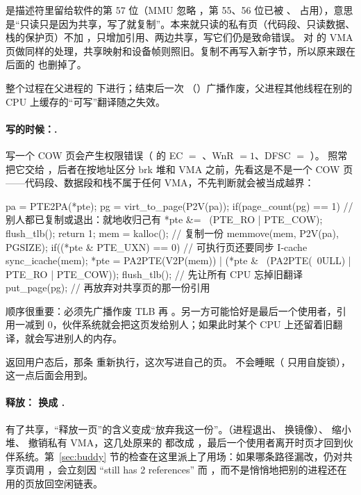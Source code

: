  是描述符里留给软件的第 57 位（MMU 忽略 \code{[58:55]}，第 55、56 位已被 、 占用），意思是“只读只是因为共享，写了就复制”。本来就只读的私有页（代码段、只读数据、栈的保护页）不加 ，只增加引用、两边共享，写它们仍是致命错误。 对  的 VMA 页做同样的处理，共享映射和设备帧则照旧。复制不再写入新字节，所以原来跟在  后面的  也删掉了。

整个过程在父进程的  下进行；结束后一次 （）广播作废，父进程其他线程在别的 CPU 上缓存的“可写”翻译随之失效。

\paragraph{写的时候：.} 写一个 COW 页会产生权限错误（ 的 EC $=$ 、WnR $=1$、DFSC $=$ ）。 照常把它交给 ，后者在按地址区分 brk 堆和 VMA 之前，先看这是不是一个 COW 页——代码段、数据段和栈不属于任何 VMA，不先判断就会被当成越界：

\begin{ccode}
pa = PTE2PA(*pte);
pg = virt_to_page(P2V(pa));
if(page_count(pg) == 1){                  // 别人都已复制或退出：就地收归己有
  *pte &= ~(PTE_RO | PTE_COW);
  flush_tlb();
  return 1;
}
mem = kalloc();                           // 复制一份
memmove(mem, P2V(pa), PGSIZE);
if((*pte & PTE_UXN) == 0)                 // 可执行页还要同步 I-cache
  sync_icache(mem);
*pte = PA2PTE(V2P(mem)) | (*pte & ~(PA2PTE(~0ULL) | PTE_RO | PTE_COW));
flush_tlb();                              // 先让所有 CPU 忘掉旧翻译
put_page(pg);                             // 再放弃对共享页的那一份引用
\end{ccode}

顺序很重要：必须先广播作废 TLB 再 。另一方可能恰好是最后一个使用者，引用一减到 0，伙伴系统就会把这页发给别人；如果此时某个 CPU 上还留着旧翻译，就会写进别人的内存。

返回用户态后，那条  重新执行，这次写进自己的页。 不会睡眠（ 只用自旋锁），这一点后面会用到。

\paragraph{释放： 换成 .} 有了共享，“释放一页”的含义变成“放弃我这一份”。（进程退出、 换镜像）、 缩小堆、 撤销私有 VMA，这几处原来的  都改成 ，最后一个使用者离开时页才回到伙伴系统。第~\ref{sec:buddy} 节的检查在这里派上了用场：如果哪条路径漏改，仍对共享页调用 ，会立刻因 “still has 2 references” 而 ，而不是悄悄地把别的进程还在用的页放回空闲链表。

